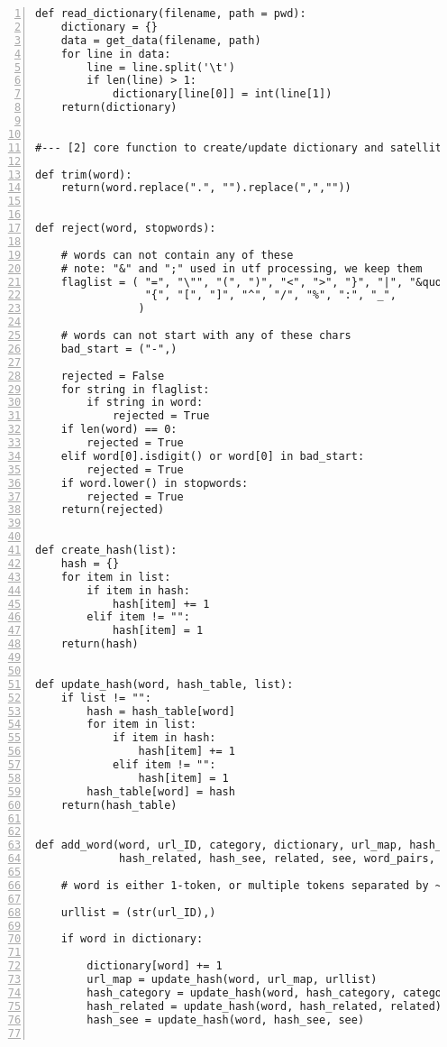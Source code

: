 \documentclass[oneside,10pt]{book}
\begin{document}
\begin{lstlisting}[numbers=left]
def read_dictionary(filename, path = pwd):
    dictionary = {}
    data = get_data(filename, path)
    for line in data:
        line = line.split('\t')
        if len(line) > 1:
            dictionary[line[0]] = int(line[1]) 
    return(dictionary)


#--- [2] core function to create/update dictionary and satellite tables

def trim(word):
    return(word.replace(".", "").replace(",",""))


def reject(word, stopwords):

    # words can not contain any of these
    # note: "&" and ";" used in utf processing, we keep them 
    flaglist = ( "=", "\"", "(", ")", "<", ">", "}", "|", "&quot;", 
                 "{", "[", "]", "^", "/", "%", ":", "_", 
                )

    # words can not start with any of these chars
    bad_start = ("-",)

    rejected = False
    for string in flaglist:
        if string in word:
            rejected = True
    if len(word) == 0:
        rejected = True
    elif word[0].isdigit() or word[0] in bad_start:
        rejected = True
    if word.lower() in stopwords:
        rejected = True
    return(rejected)


def create_hash(list): 
    hash = {}
    for item in list: 
        if item in hash:
            hash[item] += 1
        elif item != "":
            hash[item] = 1
    return(hash)


def update_hash(word, hash_table, list):
    if list != "":
        hash = hash_table[word]
        for item in list:
            if item in hash:
                hash[item] += 1
            elif item != "":
                hash[item] = 1
        hash_table[word] = hash
    return(hash_table)  


def add_word(word, url_ID, category, dictionary, url_map, hash_category, 
             hash_related, hash_see, related, see, word_pairs, word_list):

    # word is either 1-token, or multiple tokens separated by ~

    urllist = (str(url_ID),) 

    if word in dictionary:

        dictionary[word] += 1
        url_map = update_hash(word, url_map, urllist) 
        hash_category = update_hash(word, hash_category, category) 
        hash_related = update_hash(word, hash_related, related) 
        hash_see = update_hash(word, hash_see, see) 


\end{lstlisting}
\end{document}

